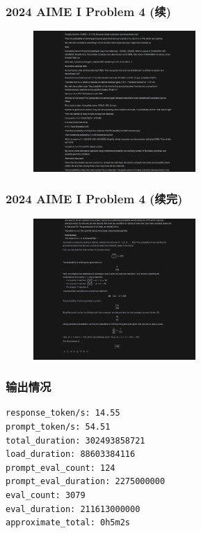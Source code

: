 \begin{frame}
\frametitle{2024 AIME I Problem 4 (续)}
\begin{figure}
    \centering
    \includegraphics[width=0.55\textwidth]{./pic/5.png} %
    \label{fig:aime_solution_3}
\end{figure}
\end{frame}

\begin{frame}
\frametitle{2024 AIME I Problem 4 (续完)}
\begin{figure}
    \centering
    \includegraphics[width=0.55\textwidth]{./pic/6.png} %
    \label{fig:aime_solution_4}
\end{figure}
\end{frame}

\begin{frame}[fragile]
\frametitle{输出情况}
    \begin{lstlisting}[caption={2024 AIME I Problem 4生成情况}]
response_token/s: 14.55
prompt_token/s: 54.51
total_duration: 302493858721
load_duration: 88603384116
prompt_eval_count: 124
prompt_eval_duration: 2275000000
eval_count: 3079
eval_duration: 211613000000
approximate_total: 0h5m2s
    \end{lstlisting}
\end{frame}

